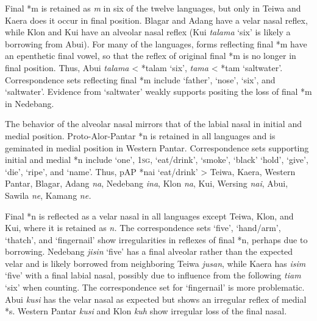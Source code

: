 Final *m is retained as \textit{m }in six of the twelve languages, but only in Teiwa and Kaera does it occur in final position. Blagar and Adang have a velar nasal reflex, while Klon and Kui have an alveolar nasal reflex (Kui \textit{talama} `six' is likely a borrowing from Abui). For many of the languages, forms reflecting final *m have an epenthetic final vowel, so that the reflex of original final *m is no longer in final position. Thus, Abui \textit{tala{\textlengthmark}ma }{\textless} *talam `six', \textit{tama} {\textless} *tam `saltwater'. Correspondence sets reflecting final *m include `father', `nose', `six', and `saltwater'. Evidence from `saltwater' weakly supports positing the loss of final *m in Nedebang. 

The behavior of the alveolar nasal mirrors that of the labial nasal in initial and medial position. Proto-Alor-Pantar *n is retained in all languages and is geminated in medial position in Western Pantar. Correspondence sets supporting initial and medial *n include `one', \textsc{1sg}, `eat/drink', `smoke', `black' `hold', `give', `die', `ripe', and `name'. Thus, pAP *nai `eat/drink' {\textgreater} Teiwa, Kaera, Western Pantar, Blagar, Adang \textit{na}, Nedebang \textit{ina}, Klon \textit{na{\textlengthmark}{\textglotstop}}, Kui, Wersing \textit{nai}, Abui, Sawila \textit{ne{\textlengthmark}}, Kamang \textit{ne. }

Final *n is reflected as a velar nasal in all languages except Teiwa, Klon, and Kui, where it is retained as \textit{n. }The correspondence sets `five', `hand/arm', `thatch', and `fingernail' show irregularities in reflexes of final *n, perhaps due to borrowing. Nedebang \textit{jisin }`five' has a final alveolar rather than the expected velar and is likely borrowed from neighboring Teiwa \textit{jusan}, while Kaera has \textit{isim} `five' with a final labial nasal, possibly due to influence from the following \textit{tiam} `six' when counting. The correspondence set for `fingernail' is more problematic. Abui \textit{kusi{\ng} }has the velar nasal as expected but shows an irregular reflex of medial *s. Western Pantar \textit{kusi }and Klon \textit{kuh} show irregular loss of the final nasal. 


